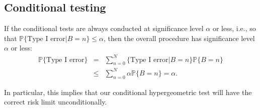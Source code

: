 \subsection{Conditional testing}
If the conditional tests are always conducted at significance level $\alpha$ or less, i.e., so that
$\mathbb{P} \{\mbox{Type I error} | B = n\} \le \alpha$, then the
overall procedure has significance level $\alpha$ or less:
\begin{eqnarray}
    \mathbb{P} \{\mbox{Type I error}\} &=& \sum_{n=0}^N \{\mbox{Type I error} |  B = n\} \mathbb{P} \{ B = n \} \nonumber \\
       & \le & \sum_{n=0}^N \alpha \mathbb{P} \{  B = n \}  =  \alpha.
\end{eqnarray}

In particular, this implies that our conditional hypergeometric test will have the correct risk limit unconditionally.
